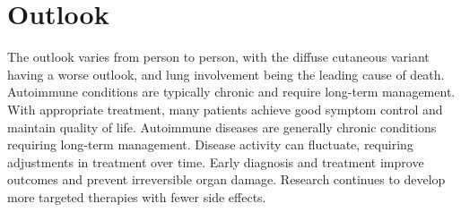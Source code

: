 \section{Outlook}
The outlook varies from person to person, with the diffuse cutaneous variant having a worse outlook, and lung involvement being the leading cause of death. Autoimmune conditions are typically chronic and require long-term management. With appropriate treatment, many patients achieve good symptom control and maintain quality of life. Autoimmune diseases are generally chronic conditions requiring long-term management. Disease activity can fluctuate, requiring adjustments in treatment over time. Early diagnosis and treatment improve outcomes and prevent irreversible organ damage. Research continues to develop more targeted therapies with fewer side effects.
